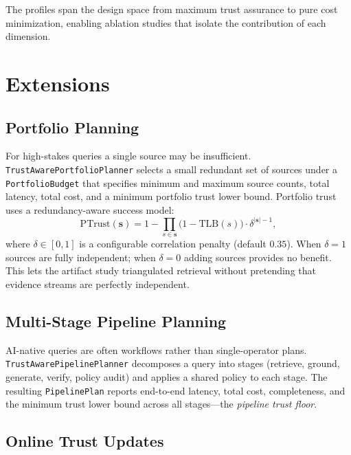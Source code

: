 \documentclass[runningheads]{llncs}
\begin{document}
The profiles span the design space from maximum trust assurance to
pure cost minimization, enabling ablation studies that isolate the
contribution of each dimension.

\section{Extensions}
\label{sec:extensions}

\subsection{Portfolio Planning}

For high-stakes queries a single source may be insufficient.
\texttt{TrustAwarePortfolioPlanner} selects a small redundant set of
sources under a \texttt{PortfolioBudget} that specifies minimum and
maximum source counts, total latency, total cost, and a minimum
portfolio trust lower bound.  Portfolio trust uses a redundancy-aware
success model:
\begin{equation}
  \text{PTrust}(\mathbf{s}) =
    1 - \prod_{s \in \mathbf{s}}\bigl(1-\text{TLB}(s)\bigr)
    \cdot \delta^{|\mathbf{s}|-1},
  \label{eq:portfolio}
\end{equation}
where $\delta \in [0,1]$ is a configurable correlation penalty (default
$0.35$).  When $\delta = 1$ sources are fully independent; when
$\delta = 0$ adding sources provides no benefit.  This lets the artifact
study triangulated retrieval without pretending that evidence streams are
perfectly independent.

\subsection{Multi-Stage Pipeline Planning}

AI-native queries are often workflows rather than single-operator plans.
\texttt{TrustAwarePipelinePlanner} decomposes a query into stages
(retrieve, ground, generate, verify, policy audit) and applies a shared
policy to each stage.  The resulting \texttt{PipelinePlan} reports
end-to-end latency, total cost, completeness, and the minimum trust
lower bound across all stages---the \emph{pipeline trust floor}.

\subsection{Online Trust Updates}
\end{document}
